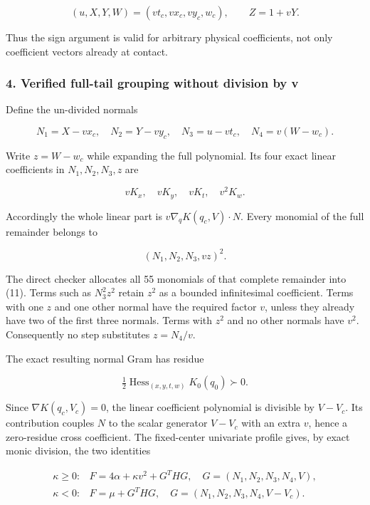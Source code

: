 \[
(u,X,Y,W)=(v t_c,v x_c,v y_c,w_c),\qquad Z=1+vY.
\]

Thus the sign argument is valid for arbitrary physical coefficients, not
only coefficient vectors already at contact.

\hypertarget{verified-full-tail-grouping-without-division-by-v}{%
\subsubsection*{4. Verified full-tail grouping without division by v}\label{p03b551f2a9a0:verified-full-tail-grouping-without-division-by-v}}

Define the un-divided normals

\[
N_1=X-vx_c,\quad N_2=Y-vy_c,\quad N_3=u-vt_c,
\quad N_4=v(W-w_c).
\tag{10}
\]

Write \(z=W-w_c\) while expanding the full polynomial. Its four exact
linear coefficients in \(N_1,N_2,N_3,z\) are

\[
vK_x,\quad vK_y,\quad vK_t,\quad v^2K_w.
\]

Accordingly the whole linear part is \(v\nabla_qK(q_c,V)\cdot N\).
Every monomial of the full remainder belongs to

\[
(N_1,N_2,N_3,vz)^2.
\tag{11}
\]

The direct checker allocates all 55 monomials of that complete remainder
into (11). Terms such as \(N_3^2z^2\) retain \(z^2\) as a bounded
infinitesimal coefficient. Terms with one \(z\) and one other normal have
the required factor \(v\), unless they already have two of the first
three normals. Terms with \(z^2\) and no other normals have \(v^2\).
Consequently no step substitutes \(z=N_4/v\).

The exact resulting normal Gram has residue

\[
\tfrac12\operatorname{Hess}_{(x,y,t,w)}K_0(q_0)\succ0.
\tag{12}
\]

Since \(\nabla K(q_c,V_c)=0\), the linear coefficient polynomial is
divisible by \(V-V_c\). Its contribution couples \(N\) to the scalar
generator \(V-V_c\) with an extra \(v\), hence a zero-residue cross
coefficient. The fixed-center univariate profile gives, by exact monic
division, the two identities

\[
\begin{array}{ll}
\kappa\ge0:&F=4\alpha+\kappa v^2+G^THG,
\quad G=(N_1,N_2,N_3,N_4,V),\\[2mm]
\kappa<0:&F=\mu+G^THG,
\quad G=(N_1,N_2,N_3,N_4,V-V_c).
\end{array}
\tag{13}
\]

